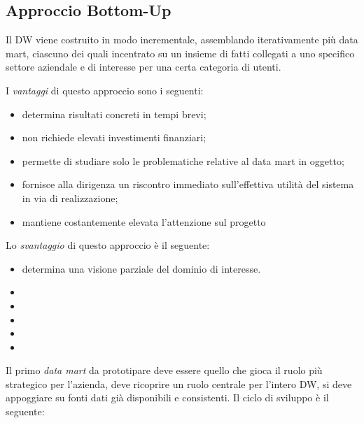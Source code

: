 \documentclass[a4paper, notitlepage, 9pt]{extreport}
\begin{document}
\subsection*{Approccio Bottom-Up}
Il DW viene costruito in modo incrementale, assemblando iterativamente più data mart, ciascuno dei quali incentrato su un insieme di fatti collegati a uno specifico settore aziendale e di interesse per una certa categoria di utenti.
\begin{multicols}{2}
	\noindent
	I \textit{vantaggi} di questo approccio sono i seguenti:
	\begin{itemize}
		\item determina risultati concreti in tempi brevi;
		\item non richiede elevati investimenti finanziari;
		\item permette di studiare solo le problematiche relative al data mart in oggetto;
		\item fornisce alla dirigenza un riscontro immediato sull’effettiva utilità del sistema in via di realizzazione;
		\item mantiene costantemente elevata l’attenzione sul progetto
	\end{itemize}
	\columnbreak
	Lo \textit{svantaggio} di questo approccio è il seguente:
	\begin{itemize}
		\item determina una visione parziale del dominio di interesse.
		\item 
		\item 
		\item 
		\item 
		\item 
	\end{itemize}
\end{multicols}
\noindent
Il primo \textit{data mart} da prototipare deve essere quello che gioca il ruolo più strategico per l’azienda, deve ricoprire un ruolo centrale per l’intero DW, si deve appoggiare su fonti dati già disponibili e consistenti. Il ciclo di sviluppo è il seguente:
\end{document}
